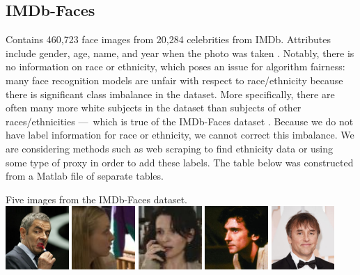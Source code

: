 \documentclass{article}
\begin{document}
\subsection{IMDb-Faces}
Contains 460,723 face images from 20,284 celebrities from IMDb. Attributes include gender, age, name, and year when the photo was taken \cite{Rothe-ICCVW-2015}. Notably, there is no information on race or ethnicity, which poses an issue for algorithm fairness: many face recognition models are unfair with respect to race/ethnicity because there is significant class imbalance in the dataset. More specifically, there are often many more white subjects in the dataset than subjects of other races/ethnicities — which is true of the IMDb-Faces dataset \cite{shepley2019deep}. Because we do not have label information for race or ethnicity, we cannot correct this imbalance. We are considering methods such as web scraping to find ethnicity data or using some type of proxy in order to add these labels.
\noindent The table below was constructed from a Matlab file of separate tables.
\newpage
\begin{center}
Five images from the IMDb-Faces dataset.\\
{\includegraphics[width=0.18\textwidth]{imdb_1.jpg}}
{\includegraphics[width=0.18\textwidth]{imdb_2.jpg}}
{\includegraphics[width=0.18\textwidth]{imdb_3.jpg}}
{\includegraphics[width=0.18\textwidth]{imdb_4.jpg}}
{\includegraphics[width=0.18\textwidth]{imdb_5.jpg}}
\end{center}
\end{document}
